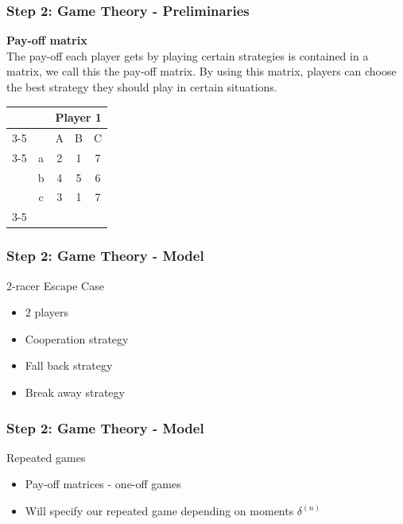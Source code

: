 \documentclass{beamer}
\begin{document}
\begin{frame}
\frametitle{Step 2: Game Theory - Preliminaries}

\textbf{Pay-off matrix}\\
The pay-off each player gets by playing certain strategies is contained in a matrix, we call this the pay-off matrix. By using this matrix, players can choose the best strategy they should play in certain situations.

\begin{example}
\begin{table}[ht!]
	\hspace{-4em}
	\centering
	\begin{tabular}{ccccc|}
		& & \multicolumn{3}{c}{Player 1}                                \\ \cline{3-5}
		& & A & B & \multicolumn{1}{c}{C}                               \\ \cline{3-5}
		\multirow{3}{*}{Player 2} & \multicolumn{1}{|c|}{a} & 2 & 1 & 7 \\
		& \multicolumn{1}{|c|}{b} & 4 & 5 & 6                           \\
		& \multicolumn{1}{|c|}{c} & 3 & 1 & 7                           \\ \cline{3-5}
	\end{tabular}
\end{table}
\end{example}

\end{frame}

\begin{frame}
\frametitle{Step 2: Game Theory - Model}
\begin{block}{2-racer Escape Case}
	\begin{itemize}
		\item 2 players
		\item Cooperation strategy
		\item Fall back strategy
		\item Break away strategy
	\end{itemize}
\end{block}
\end{frame}

\begin{frame}
\frametitle{Step 2: Game Theory - Model}
\begin{block}{Repeated games}
	\begin{itemize}
		\item Pay-off matrices - one-off games
		\item Will specify our repeated game depending on moments $\delta^{(n)}$
	\end{itemize}
\end{block}
\end{frame}
\end{document}
